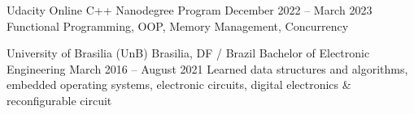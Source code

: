 

\begin{cventries}

  \cventry
    {Udacity} %
    {Online} %
    {C++ Nanodegree Program} %
    {December 2022 -- March 2023} %
    {Functional Programming, OOP, Memory Management, Concurrency}

  \cventry
    {University of Brasilia (UnB)} %
    {Brasilia, DF / Brazil} %
    {Bachelor of Electronic Engineering} %
    {March 2016 -- August 2021} %
    { Learned data structures and algorithms, embedded operating systems, electronic circuits, digital electronics \& reconfigurable circuit}

\end{cventries}
